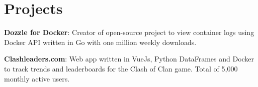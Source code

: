 \documentclass[letterpaper,11pt]{article}
\newcommand{\resumeItem}[2]{
  \item\small{
    \textbf{#1}{: #2 \vspace{-2pt}}
  }
}
\newcommand{\resumeSubItem}[2]{\resumeItem{#1}{#2}\vspace{-4pt}}
\newcommand{\resumeSubHeadingListStart}{\begin{description}}
\newcommand{\resumeSubHeadingListEnd}{\end{description}}
\begin{document}
  \pagebreak[3]
\section{Projects}
  \resumeSubHeadingListStart
    \resumeSubItem{Dozzle for Docker}
      {Creator of open-source project to view container logs using Docker API written in Go with one million weekly downloads.}
    \resumeSubItem{Clashleaders.com}
      {Web app written in VueJs, Python DataFrames and Docker to track trends and leaderboards for the Clash of Clan game. Total of 5,000 monthly active users.}
  \resumeSubHeadingListEnd

%


\end{document}
